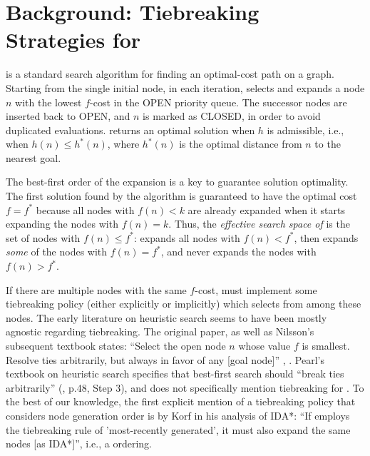 \section{Background: Tiebreaking Strategies for \astar}

\label{sec:astar-background}

\astar is a standard search algorithm for finding an optimal-cost path
on a graph.
Starting from the single initial node, in each iteration, \astar
selects and expands a node $n$ with the lowest $f$-cost in the OPEN
priority queue. The successor nodes are inserted back to OPEN, and $n$
is marked as CLOSED, in order to avoid duplicated evaluations.
\astar returns an optimal solution when $h$ is admissible, i.e., when
$h(n) \leq h^*(n)$, where $h^*(n)$ is the optimal distance from $n$ to
the nearest goal.

The best-first order of the expansion is a key to guarantee solution optimality. 
The first solution found by the algorithm is guaranteed to have the optimal cost $f=f^*$ because 
all nodes with $f(n) < k$ are already expanded when it starts expanding
the nodes with $f(n) = k$.
Thus, the \emph{effective search space of \astar} is the set of nodes with 
$f(n) \leq f^*$: \astar expands all nodes with $f(n) < f^*$, then
expands \emph{some} of the nodes with $f(n) = f^*$, and
never expands the nodes with $f(n) > f^*$.

If there are multiple nodes with the same $f$-cost, \astar
must implement some tiebreaking policy (either
explicitly or implicitly) which selects from among these nodes.
The early literature on heuristic search seems to have been mostly agnostic regarding tiebreaking.
The original \astar paper, as well as Nilsson's subsequent textbook 
states: ``Select the open node $n$ whose value $f$
is smallest. Resolve ties arbitrarily, but always in favor of any [goal
node]'' \cite[p.102 Step 2]{hart1968formal}, \cite[p.69]{Nilsson71}.
Pearl's textbook on heuristic search specifies that best-first search should ``break ties arbitrarily'' (\citeyear{pearl1984heuristics}, p.48, Step 3), and does not specifically mention tiebreaking for \astar.
To the best of our knowledge, the first explicit mention of a tiebreaking policy that considers node generation order is by Korf in his analysis of IDA*: ``If \astar employs the tiebreaking rule of 'most-recently generated', it must also expand the same nodes [as IDA*]'', i.e., a \lifo ordering.

